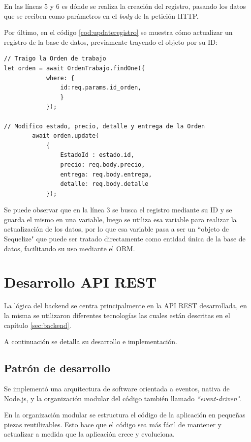En las líneas 5 y 6 es dónde se realiza la creación del registro, pasando los datos que se reciben como parámetros en el \textit{body} de la petición HTTP.

Por último, en el código \ref{cod:updateregistro} se muestra cómo actualizar un registro de la base de datos, previamente trayendo el objeto por su ID:

\begin{lstlisting}[label=cod:updateregistro,caption=Código resumido para actualizar un registro en la base de datos.]
// Traigo la Orden de trabajo
let orden = await OrdenTrabajo.findOne({
            where: {
                id:req.params.id_orden,
                }
            });
            
// Modifico estado, precio, detalle y entrega de la Orden
        await orden.update(
            {
                EstadoId : estado.id,
                precio: req.body.precio,
                entrega: req.body.entrega,
                detalle: req.body.detalle
            });
\end{lstlisting}

Se puede observar que en la línea 3 se busca el registro mediante su ID y se guarda el mismo en una variable, luego se utiliza esa variable para realizar la actualización de los datos, por lo que esa variable pasa a ser un ``objeto de Sequelize" que puede ser tratado directamente como entidad única de la base de datos, facilitando su uso mediante el ORM.


\section{Desarrollo API REST}
\label{sec:arquitecturaapirest}

La lógica del backend se centra principalmente en la API REST desarrollada, en la misma se utilizaron diferentes tecnologías las cuales están descritas en el capítulo \ref{sec:backend}.

A continuación se detalla su desarrollo e implementación.

\subsection{Patrón de desarrollo}
\label{subsec:apipatron}

Se implementó una arquitectura de software orientada a eventos, nativa de Node.js, y la organización modular del código también llamado \textit{``event-driven"}.

En la organización modular se estructura el código de la aplicación en pequeñas piezas reutilizables. Esto hace que el código sea más fácil de mantener y actualizar a medida que la aplicación crece y evoluciona.

